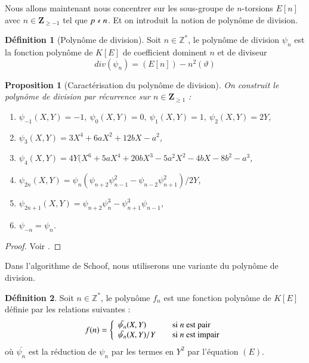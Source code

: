 \documentclass{article}%
\theoremstyle{plain}
\theoremstyle{definition}
\newtheorem{definition}{Définition}[section]
\theoremstyle{plain}
\newtheorem{proposition}{Proposition}[section]
\theoremstyle{remark}
\begin{document}
Nous allons maintenant nous concentrer sur les sous-groupe de $n$-torsions $E[n]$ avec $n\in\mathbf{Z}_{\geq -1}$ tel que $p\nshortmid n$. Et on introduit la notion de polynôme de division.

\begin{definition}[Polynôme de division]
Soit $n\in\mathbb{Z}^{*}$, le polynôme de division $\psi_{n}$ est la fonction polynôme de $K[E]$ de coefficient dominent $n$ et de diviseur $$div(\psi_{n})=(E[n])-n^{2}(\vartheta)$$
\end{definition}

\begin{proposition}[Caractérisation du polynôme de division]
On construit le polynôme de division par récurrence sur $n\in\mathbf{Z}_{\geq 1}$ :
\begin{enumerate}
\item $\psi_{-1}(X,Y)=-1,\ \psi_{0}(X,Y)=0,\ \psi_{1}(X,Y)=1,\ \psi_{2}(X,Y)=2Y$,
\item $\psi_{3}(X,Y)=3X^{4} + 6aX^{2} + 12bX - a^{2}$,
\item $\psi_{4}(X,Y)=4Y(X^{6} + 5aX^{4} + 20bX^{3} - 5a^{2}X^{2} - 4bX - 8b^{2} - a^{3}$,
\item $\psi_{2n}(X,Y)=\psi_{n}(\psi_{n+2}\psi_{n-1}^{2} - \psi_{n-2}\psi_{n+1}^{2})/2Y$,
\item $\psi_{2n+1}(X,Y)=\psi_{n+2}\psi_{n}^{3} - \psi_{n+1}^{3}\psi_{n-1}$,
\item $\psi_{-n}=\psi_{n}$.
\end{enumerate}
\end{proposition}

\begin{proof}
Voir \cite{ref4}.
\end{proof}

Dans l'algorithme de Schoof, nous utiliserons une variante du polynôme de division.

\begin{definition}
Soit $n\in\mathbb{Z}^{*}$, le polynôme $f_{n}$ est une fonction polynôme de $K[E]$ définie par les relations suivantes : 
$$
f(n) = \left\{
\begin{array}{l l}
  \bar{\psi_{n}}(X,Y) & \quad \text{si } n \text{ est pair}\\
  \bar{\psi_{n}}(X,Y)/Y & \quad \text{si } n \text{ est impair}\\ \end{array} \right.
$$
où $\bar{\psi_{n}}$ est la réduction de $\psi_{n}$ par les termes en $Y^{2}$ par l'équation $(E)$.
\end{definition}
\end{document}
